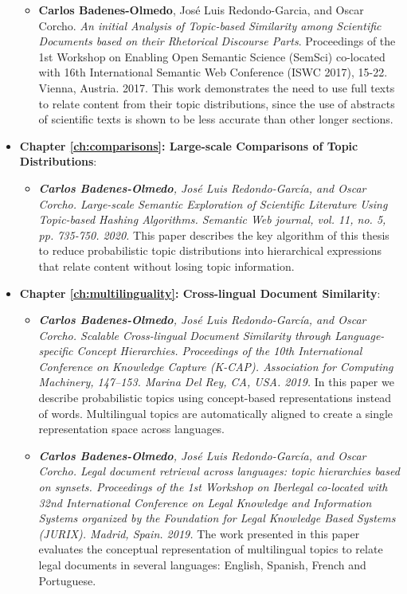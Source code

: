 \begin{itemize}
\begin{itemize}
\item \textbf{Carlos Badenes-Olmedo}, José Luis Redondo-Garcia, and Oscar Corcho. \textit{An initial Analysis of Topic-based Similarity among Scientific Documents based on their Rhetorical Discourse Parts}. Proceedings of the 1st Workshop on Enabling Open Semantic Science (SemSci) co-located with 16th International Semantic Web Conference (ISWC 2017), 15-22. Vienna, Austria. 2017. This work demonstrates the need to use full texts to relate content from their topic distributions, since the use of abstracts of scientific texts is shown to be less accurate than other longer sections. 
\end{itemize}
\item \textbf{Chapter \ref{ch:comparisons}: Large-scale Comparisons of Topic Distributions}:
\begin{itemize}
\item \textit{\textbf{Carlos Badenes-Olmedo}, José Luis Redondo-García, and Oscar Corcho. \textit{Large-scale Semantic Exploration of Scientific Literature Using Topic-based Hashing Algorithms}. Semantic Web journal, vol. 11, no. 5, pp. 735-750. 2020.} This paper describes the key algorithm of this thesis to reduce probabilistic topic distributions into hierarchical expressions that relate content without losing topic information.
\end{itemize}
\item \textbf{Chapter \ref{ch:multilinguality}: Cross-lingual Document Similarity}:
\begin{itemize}
\item \textit{\textbf{Carlos Badenes-Olmedo}, José Luis Redondo-García, and Oscar Corcho. \textit{Scalable Cross-lingual Document Similarity through Language-specific Concept Hierarchies}. Proceedings of the 10th International Conference on Knowledge Capture (K-CAP). Association for Computing Machinery, 147–153. Marina Del Rey, CA, USA. 2019.} In this paper we describe probabilistic topics using concept-based representations instead of words.  Multilingual topics are automatically aligned to create a single representation space across languages.   
\item \textit{\textbf{Carlos Badenes-Olmedo}, José Luis Redondo-García, and Oscar Corcho. \textit{Legal document retrieval across languages: topic hierarchies based on synsets}. Proceedings of the 1st Workshop on Iberlegal co-located with 32nd International Conference on Legal Knowledge and Information Systems organized by the Foundation for Legal Knowledge Based Systems (JURIX). Madrid, Spain. 2019.} The work presented in this paper evaluates the conceptual representation of multilingual topics to relate legal documents in several languages: English, Spanish, French and Portuguese.

\end{itemize}
\end{itemize}
